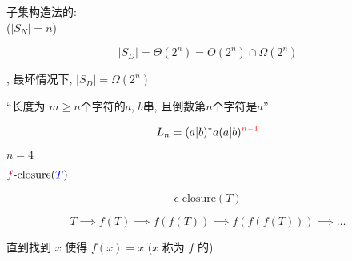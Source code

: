 %

\begin{frame}{}
  \begin{center}
    子集构造法的: \\
    ($|S_{N}| = n$)

    \[
      |S_{D}| = \Theta(2^n) = O(2^n) \cap \Omega(2^n)
    \]

    \vspace{0.50cm}
    , 最坏情况下, $|S_{D}| = \Omega(2^n)$
  \end{center}
\end{frame}

\begin{frame}{}
  \begin{center}
    ``长度为 $m \ge n$个字符的$a$, $b$串, 且倒数第$n$个字符是$a$''

    \pause
    \[
      L_{n} = (a | b)^{\ast} a (a | b)^{\textcolor{red}{n-1}}
    \]

    \pause

    \pause
    \vspace{0.30cm}
    $n = 4$
  \end{center}
\end{frame}

\begin{frame}{}
\end{frame}

\begin{frame}{}
  \begin{center}
     $\textcolor{purple}{f}\text{-closure}(\textcolor{blue}{T})$

    \pause
    \[
      \epsilon\text{-closure}(T)
    \]

    \pause
    \[
      T \implies f(T) \implies f(f(T)) \implies f(f(f(T))) \implies \dots
    \]

    \pause
    直到找到 $x$ 使得 $f(x) = x$ ($x$ 称为 $f$ 的)
  \end{center}
\end{frame}
